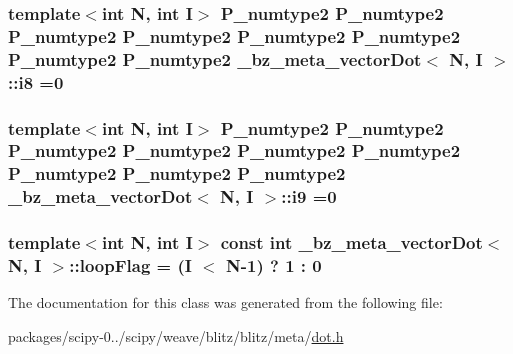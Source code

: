 \subsubsection[{i8}]{\setlength{\rightskip}{0pt plus 5cm}template$<$int N, int I$>$ P\+\_\+numtype2 P\+\_\+numtype2 P\+\_\+numtype2 P\+\_\+numtype2 P\+\_\+numtype2 P\+\_\+numtype2 P\+\_\+numtype2 P\+\_\+numtype2 {\bf \+\_\+bz\+\_\+meta\+\_\+vector\+Dot}$<$ {\bf N}, I $>$\+::i8 =0}\label{class__bz__meta__vectorDot_a55f15e8fefa216f49bd5119b0af133ed}
\hypertarget{class__bz__meta__vectorDot_ad59d3e16ee2ccccc95109dd7371931ef}{}
\subsubsection[{i9}]{\setlength{\rightskip}{0pt plus 5cm}template$<$int N, int I$>$ P\+\_\+numtype2 P\+\_\+numtype2 P\+\_\+numtype2 P\+\_\+numtype2 P\+\_\+numtype2 P\+\_\+numtype2 P\+\_\+numtype2 P\+\_\+numtype2 P\+\_\+numtype2 {\bf \+\_\+bz\+\_\+meta\+\_\+vector\+Dot}$<$ {\bf N}, I $>$\+::i9 =0}\label{class__bz__meta__vectorDot_ad59d3e16ee2ccccc95109dd7371931ef}
\hypertarget{class__bz__meta__vectorDot_a34c2503a3f004cdf6c10fe12b9a2e74c}{}
\subsubsection[{loop\+Flag}]{\setlength{\rightskip}{0pt plus 5cm}template$<$int N, int I$>$ const int {\bf \+\_\+bz\+\_\+meta\+\_\+vector\+Dot}$<$ {\bf N}, I $>$\+::loop\+Flag = (I $<$ {\bf N}-\/1) ? 1 \+: 0\hspace{0.3cm}{\ttfamily [static]}}\label{class__bz__meta__vectorDot_a34c2503a3f004cdf6c10fe12b9a2e74c}


The documentation for this class was generated from the following file\+:\begin{DoxyCompactItemize}
\item 
packages/scipy-\/0../scipy/weave/blitz/blitz/meta/\hyperlink{dot_8h}{dot.\+h}\end{DoxyCompactItemize}
